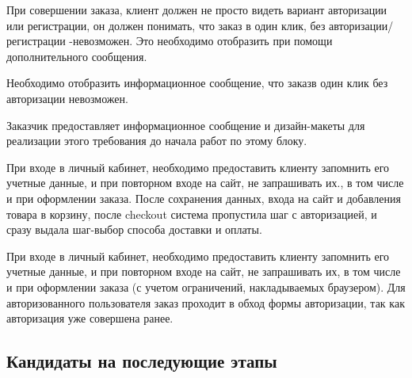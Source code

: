 {

\begin{wiki}
При совершении заказа, клиент должен не просто видеть вариант авторизации или регистрации, он должен понимать, что заказ в один клик, без авторизации/регистрации -невозможен. Это необходимо отобразить при помощи дополнительного сообщения.
\end{wiki}


\begin{itogo}
Необходимо отобразить информационное сообщение, что заказв один клик без авторизации невозможен.
\end{itogo}

Заказчик предоставляет информационное сообщение и дизайн-макеты для реализации этого требования до начала работ по этому блоку.
}

{

\begin{wiki}
При входе в личный кабинет, необходимо предоставить клиенту запомнить его учетные данные, и при повторном входе на сайт, не запрашивать их., в том числе и при оформлении заказа. После сохранения данных, входа на сайт и добавления товара в корзину, после checkout система пропустила шаг с авторизацией, и сразу выдала шаг-выбор способа доставки и оплаты. 
\end{wiki}


\begin{itogo}
При входе в личный кабинет, необходимо предоставить клиенту запомнить его учетные данные, и при повторном входе на сайт, не запрашивать их, в том числе и при оформлении заказа (с учетом ограничений, накладываемых браузером). 
Для авторизованного пользователя заказ проходит в обход формы авторизации, так как авторизация уже совершена ранее.
\end{itogo}

}

\ifcand
\subsection{Кандидаты на последующие этапы}
\fi

